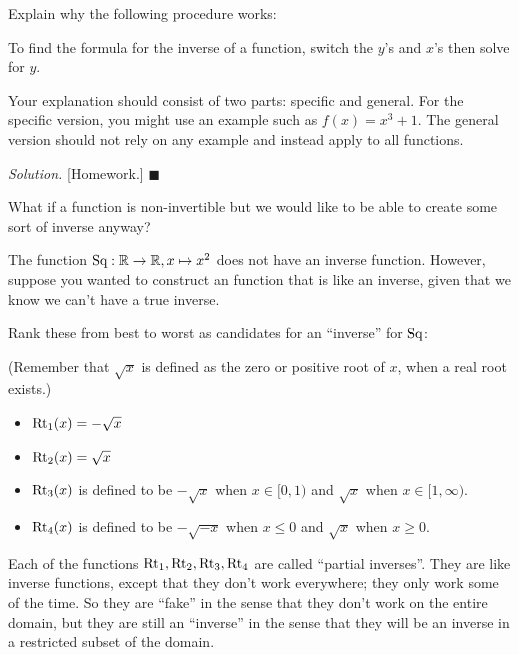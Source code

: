 \documentclass[11pt]{article}
\newenvironment{task}
	{\begin{mdframed}[linecolor=lightgray, linewidth=3pt]\raggedright}
	{\end{mdframed}}
\newcommand\tn{\textnormal}
\newcommand{\R}{\mathbb{R}}
\theoremstyle{definition}
\newenvironment{solution}{{\it Solution.} }{\hfill {\color{lightgray}$\blacksquare$}}
\begin{document}
\begin{task}
Explain why the following procedure works:

To find the formula for the inverse of a function, switch the $y$'s and $x$'s then solve for $y$.

Your explanation should consist of two parts: specific and general. For the specific version, you might use an example such as $f(x)=x^3+1$. The general version should not rely on any example and instead apply to all functions.
\end{task}

\begin{solution} [Homework.] \end{solution}

What if a function is non-invertible but we would like to be able to create some sort of inverse anyway? 

\begin{task}
The function $\tn{Sq}:\R\to\R, x\mapsto x^2$ does not have an inverse function. However, suppose you wanted to construct an function that is like an inverse, given that we know we can't have a true inverse.

Rank these from best to worst as candidates for an ``inverse'' for $\tn{Sq}$:

(Remember that $\sqrt{x}$ is defined as the zero or positive root of $x$, when a real root exists.)

\begin{itemize}[label=$\circ$]
\item $\tn{Rt}_1(x)=-\sqrt{x}$ 
\item $\tn{Rt}_2(x)=\sqrt{x}$
\item $\tn{Rt}_3(x)$ is defined to be $-\sqrt{x}$ when $x\in[0,1)$ and $\sqrt{x}$ when $x\in [1,\infty)$.
\item $\tn{Rt}_4(x)$ is defined to be $-\sqrt{-x}$ when $x\leq 0$ and $\sqrt{x}$ when $x\geq 0$.
\end{itemize}
\end{task}

Each of the functions $\tn{Rt}_1, \tn{Rt}_2, \tn{Rt}_3, \tn{Rt}_4$ are called ``partial inverses''. They are like inverse functions, except that they don't work everywhere; they only work some of the time. So they are ``fake'' in the sense that they don't work on the entire domain, but they are still an ``inverse'' in the sense that they will be an inverse in a restricted subset of the domain.
\end{document}
